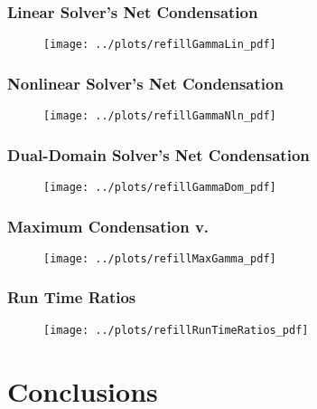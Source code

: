 \documentclass[compress,xcolor=table]{beamer}
\begin{document}
\begin{frame}
\frametitle{Linear Solver's Net Condensation}

\begin{figure}[h!t]
\centering
\texttt{[image: ../plots/refillGammaLin\_pdf]}
\end{figure}

\end{frame}%
\begin{frame}
\frametitle{Nonlinear Solver's Net Condensation}

\begin{figure}[h!t]
\centering
\texttt{[image: ../plots/refillGammaNln\_pdf]}
\end{figure}

\end{frame}
\begin{frame}
\frametitle{Dual-Domain Solver's Net Condensation}

\begin{figure}[h!t]
\centering
\texttt{[image: ../plots/refillGammaDom\_pdf]}
\end{figure}

\end{frame}
\begin{frame}
\frametitle{Maximum Condensation v. \dtmax{}}

\begin{figure}[h!t]
\centering
\texttt{[image: ../plots/refillMaxGamma\_pdf]}
\end{figure}

\end{frame}
\begin{frame}
\frametitle{Run Time Ratios}

\begin{figure}[h!t]
\centering
\texttt{[image: ../plots/refillRunTimeRatios\_pdf]}
\end{figure}

\end{frame}
\section[Conclusions]{Conclusions}
\end{document}
